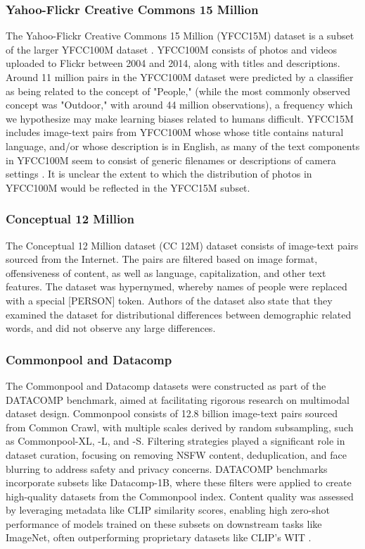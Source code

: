 \subsubsection{Yahoo-Flickr Creative Commons 15 Million}
The Yahoo-Flickr Creative Commons 15 Million (YFCC15M) dataset \cite{Radford2021LearningSupervision} is a subset of the larger YFCC100M dataset \cite{Thomee2016YFCC100M:Research}. YFCC100M consists of photos and videos uploaded to Flickr between 2004 and 2014, along with titles and descriptions. Around 11 million pairs in the YFCC100M dataset were predicted by a classifier as being related to the concept of "People," (while the most commonly observed concept was "Outdoor," with around 44 million observations), a frequency which we hypothesize may make learning biases related to humans difficult. YFCC15M includes image-text pairs from YFCC100M whose whose title contains natural language, and/or whose description is in English, as many of the text components in YFCC100M seem to consist of generic filenames or descriptions of camera settings  \cite{Radford2021LearningSupervision}. It is unclear the extent to which the distribution of photos in YFCC100M would be reflected in the YFCC15M subset. 

\subsubsection{Conceptual 12 Million}
The Conceptual 12 Million dataset (CC 12M) dataset  \cite{Changpinyo2021ConceptualConcepts} consists of image-text pairs sourced from the Internet. The pairs are filtered based on image format, offensiveness of content, as well as language, capitalization, and other text features. The dataset was hypernymed, whereby names of people were replaced with a special [PERSON] token. Authors of the dataset also state that they examined the dataset for distributional differences between demographic related words, and did not observe any large differences. 

\subsubsection{Commonpool and Datacomp} The Commonpool and Datacomp datasets were constructed as part of the DATACOMP benchmark, aimed at facilitating rigorous research on multimodal dataset design. Commonpool consists of 12.8 billion image-text pairs sourced from Common Crawl, with multiple scales derived by random subsampling, such as Commonpool-XL, -L, and -S. Filtering strategies played a significant role in dataset curation, focusing on removing NSFW content, deduplication, and face blurring to address safety and privacy concerns. DATACOMP benchmarks incorporate subsets like Datacomp-1B, where these filters were applied to create high-quality datasets from the Commonpool index. Content quality was assessed by leveraging metadata like CLIP similarity scores, enabling high zero-shot performance of models trained on these subsets on downstream tasks like ImageNet, often outperforming proprietary datasets like CLIP's WIT \cite{gadre2024datacomp}.

